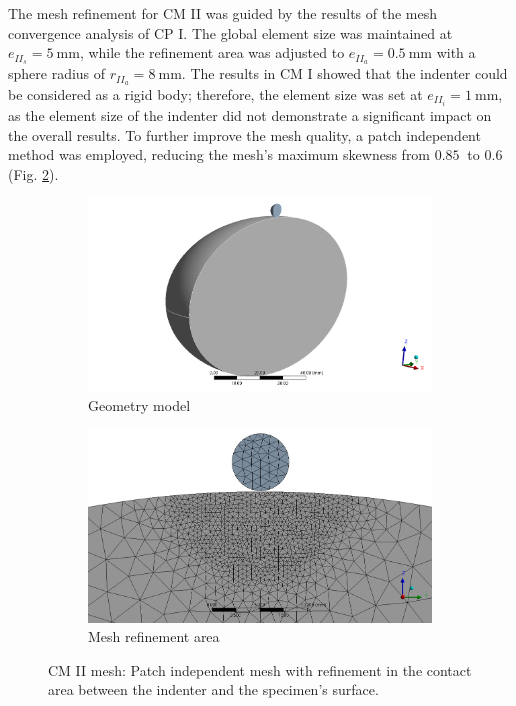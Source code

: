 The mesh refinement for CM II was guided by the results of the mesh convergence analysis of CP I.
The global element size was maintained at $e_{{II}_s}=\SI{5}{\milli\meter}$, while the refinement area
was adjusted to $e_{{II}_a}=\SI{0.5}{\milli\meter}$ with a sphere radius of $r_{{II}_a}=\SI{8}{\milli\meter}$.
The results in CM I showed that the indenter could be considered as a rigid body; therefore, the element size was 
set at $e_{{II}_i}=\SI{1}{\milli\meter}$, as the element size of the indenter did not demonstrate a significant impact on the overall results.
To further improve the mesh quality, a patch independent method was employed, reducing the mesh's 
maximum skewness from $\SI{0.85}{}$ to $\SI{0.6}{}$ (Fig. \ref{fig:cm2meshref}).
\begin{figure}
    \centering
    \begin{subfigure}[b]{0.45\textwidth}
    \centering
    \includegraphics[width=\textwidth]{Images/computational/cm2geometry.png}
    \caption{Geometry model}
    \label{fig:cm2meshtotal}
    \end{subfigure}
    \hfill
    \begin{subfigure}[b]{0.45\textwidth}
    \centering
    \includegraphics[width=\textwidth]{Images/computational/cm2meshzoom.png}
    \caption{Mesh refinement area}
    \label{fig:cm2meshref}
    \end{subfigure}
    \hspace{0.3cm}
    \caption[Computational model II mesh]{CM II mesh: Patch independent mesh with refinement in the contact area between the indenter and the specimen's surface.}
    \label{fig:cmIImesh}
\end{figure}

